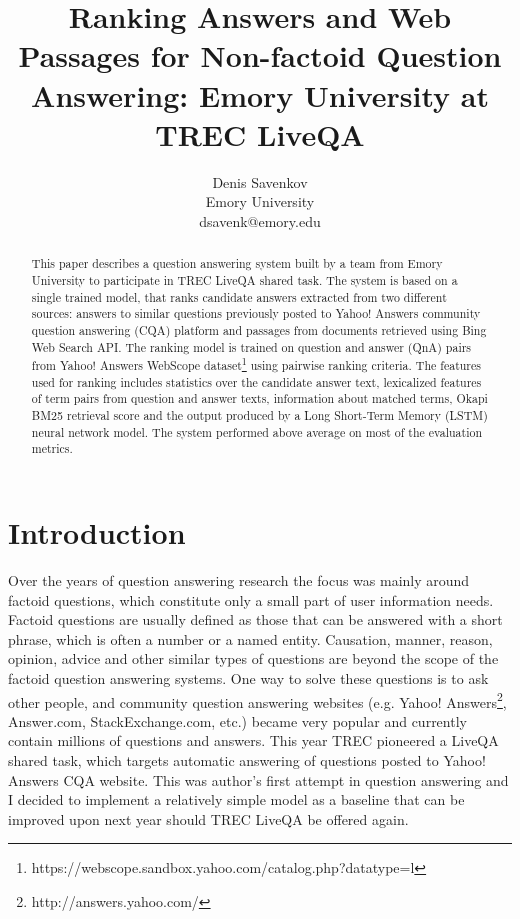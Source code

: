 \documentclass[]{article}
\title{Ranking Answers and Web Passages for Non-factoid Question Answering: Emory University at TREC LiveQA}
\author{Denis Savenkov\\Emory University\\dsavenk@emory.edu}
\date{}
\begin{document}
\maketitle

\begin{abstract}
This paper describes a question answering system built by a team from Emory University to participate in TREC LiveQA shared task.
The system is based on a single trained model, that ranks candidate answers extracted from two different sources: answers to similar questions previously posted to Yahoo! Answers community question answering (CQA) platform and passages from documents retrieved using Bing Web Search API.
The ranking model is trained on question and answer (QnA) pairs from Yahoo! Answers WebScope dataset\footnote{https://webscope.sandbox.yahoo.com/catalog.php?datatype=l} using pairwise ranking criteria.
The features used for ranking includes statistics over the candidate answer text, lexicalized features of term pairs from question and answer texts, information about matched terms, Okapi BM25 retrieval score and the output produced by a Long Short-Term Memory (LSTM) neural network model.
The system performed above average on most of the evaluation metrics.

\end{abstract}

\section{Introduction}
Over the years of question answering research the focus was mainly around factoid questions, which constitute only a small part of user information needs.
Factoid questions are usually defined as those that can be answered with a short phrase, which is often a number or a named entity.
Causation, manner, reason, opinion, advice and other similar types of questions are beyond the scope of the factoid question answering systems.
One way to solve these questions is to ask other people, and community question answering websites (e.g. Yahoo! Answers\footnote{http://answers.yahoo.com/}, Answer.com, StackExchange.com, etc.) became very popular and currently contain millions of questions and answers.
This year TREC pioneered a LiveQA shared task, which targets automatic answering of questions posted to Yahoo! Answers CQA website.
This was author's first attempt in question answering and I decided to implement a relatively simple model as a baseline that can be improved upon next year should TREC LiveQA be offered again.
\end{document}
